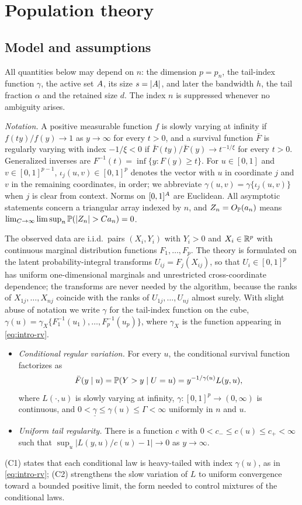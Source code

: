 \section{Population theory}\label{sec:population}

\subsection{Model and assumptions}

All quantities below may depend on $n$: the dimension $p=p_n$, the
tail-index function $\gamma$, the active set $A$, its size $s=|A|$, and
later the bandwidth $h$, the tail fraction $\alpha$ and the retained size
$d$. The index $n$ is suppressed whenever no ambiguity arises.

\emph{Notation.} A positive measurable function $f$ is slowly varying
at infinity if $f(ty)/f(y)\to1$ as $y\to\infty$ for every $t>0$, and a
survival function $\bar F$ is regularly varying with index $-1/\xi<0$
if $\bar F(ty)/\bar F(y)\to t^{-1/\xi}$ for every $t>0$. Generalized
inverses are $F^{-1}(t)=\inf\{y:F(y)\ge t\}$. For $u\in[0,1]$ and
$v\in[0,1]^{p-1}$, $\iota_j(u,v)\in[0,1]^p$ denotes the vector with
$u$ in coordinate $j$ and $v$ in the remaining coordinates, in order;
we abbreviate $\gamma(u,v)=\gamma\{\iota_j(u,v)\}$ when $j$ is clear
from context. Norms on $[0,1]^{A}$ are Euclidean. All asymptotic
statements concern a triangular array indexed by $n$, and
$Z_n=O_{\mathbb P}(a_n)$ means $\lim_{C\to\infty}\limsup_n
\Pp(|Z_n|>Ca_n)=0$.

The observed data are i.i.d.\ pairs $(X_i,Y_i)$ with $Y_i>0$ and
$X_i\in\mathbb R^p$ with continuous marginal distribution functions
$F_1,\ldots,F_p$. The theory is formulated on the latent
probability-integral transforms $U_{ij}=F_j(X_{ij})$, so that
$U_i\in[0,1]^p$ has uniform one-dimensional marginals and unrestricted
cross-coordinate dependence; the transforms are never needed by the
algorithm, because the ranks of $X_{1j},\ldots,X_{nj}$ coincide with the
ranks of $U_{1j},\ldots,U_{nj}$ almost surely. With slight abuse of
notation we write $\gamma$ for the tail-index function on the cube,
$\gamma(u)=\gamma_X\{F_1^{-1}(u_1),\ldots,F_p^{-1}(u_p)\}$, where
$\gamma_X$ is the function appearing in \eqref{eq:intro-rv}.

\begin{itemize}
\item[(C1)] \emph{Conditional regular variation.} For every $u$, the
conditional survival function factorizes as
\[
 \bar F(y\mid u)=\mathbb P(Y>y\mid U=u)=y^{-1/\gamma(u)}L(y,u),
\]
where $L(\cdot,u)$ is slowly varying at infinity,
$\gamma:[0,1]^{p}\to(0,\infty)$ is continuous, and
$0<\underline\gamma\le\gamma(u)\le\Gamma<\infty$ uniformly in $n$ and
$u$.
\item[(C2)] \emph{Uniform tail regularity.} There is a function $c$ with
$0<c_-\le c(u)\le c_+<\infty$ such that
$\sup_u|L(y,u)/c(u)-1|\to0$ as $y\to\infty$.
\end{itemize}
(C1) states that each conditional law is heavy-tailed with index
$\gamma(u)$, as in \eqref{eq:intro-rv}; (C2) strengthens the slow
variation of $L$ to uniform convergence toward a bounded positive limit,
the form needed to control mixtures of the conditional laws.

